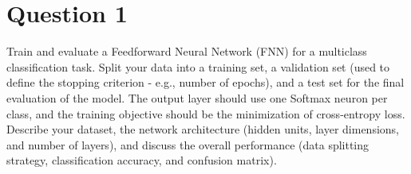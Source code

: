\section{Question 1}
Train and evaluate a Feedforward Neural Network (FNN) for a  multiclass classification task.
%
Split your data into a training set, a validation set 
(used to define the stopping criterion - e.g., number of epochs), 
and a test set for the final evaluation of the model. 
%
The output layer should use one Softmax neuron per class, 
and the training objective should be the minimization of cross-entropy loss. 
%
Describe your dataset, the network architecture
(hidden units, layer dimensions, and number of layers), 
and discuss the overall performance
(data splitting strategy, classification accuracy, and confusion matrix).
